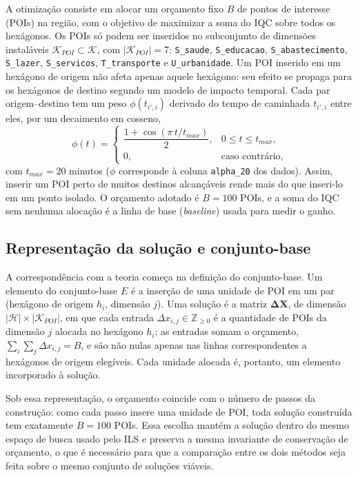 \documentclass[11pt,a4paper]{article}
\newcommand{\code}[1]{\texttt{#1}}
\begin{document}
A otimização consiste em alocar um orçamento fixo $B$ de pontos de interesse (POIs) na região, com o objetivo de maximizar a soma do IQC sobre todos os hexágonos. Os POIs só podem ser inseridos no subconjunto de dimensões instaláveis $\mathcal{K}_{POI} \subset \mathcal{K}$, com $|\mathcal{K}_{POI}| = 7$: \code{S\_saude}, \code{S\_educacao}, \code{S\_abastecimento}, \code{S\_lazer}, \code{S\_servicos}, \code{T\_transporte} e \code{U\_urbanidade}. Um POI inserido em um hexágono de origem não afeta apenas aquele hexágono: seu efeito se propaga para os hexágonos de destino segundo um modelo de impacto temporal. Cada par origem--destino tem um peso $\phi(t_{i',i})$ derivado do tempo de caminhada $t_{i',i}$ entre eles, por um decaimento em cosseno,
\begin{equation}
\phi(t) =
\begin{cases}
\dfrac{1 + \cos\!\left(\pi\,t/t_{max}\right)}{2}, & 0 \le t \le t_{max},\\[2mm]
0, & \text{caso contrário},
\end{cases}
\label{eq:alpha20}
\end{equation}
com $t_{max} = 20$ minutos ($\phi$ corresponde à coluna \code{alpha\_20} dos dados). Assim, inserir um POI perto de muitos destinos alcançáveis rende mais do que inseri-lo em um ponto isolado. O orçamento adotado é $B = 100$ POIs, e a soma do IQC sem nenhuma alocação é a linha de base (\emph{baseline}) usada para medir o ganho.

\subsection{Representação da solução e conjunto-base}

A correspondência com a teoria começa na definição do conjunto-base. Um elemento do conjunto-base $E$ é a inserção de uma unidade de POI em um par (hexágono de origem $h_i$, dimensão $j$). Uma solução é a matriz $\mathbf{\Delta X}$, de dimensão $|\mathcal{H}| \times |\mathcal{K}_{POI}|$, em que cada entrada $\Delta x_{i,j} \in \mathbb{Z}_{\ge 0}$ é a quantidade de POIs da dimensão $j$ alocada no hexágono $h_i$; as entradas somam o orçamento, $\sum_{i}\sum_{j} \Delta x_{i,j} = B$, e são não nulas apenas nas linhas correspondentes a hexágonos de origem elegíveis. Cada unidade alocada é, portanto, um elemento incorporado à solução.

Sob essa representação, o orçamento coincide com o número de passos da construção: como cada passo insere uma unidade de POI, toda solução construída tem exatamente $B = 100$ POIs. Essa escolha mantém a solução dentro do mesmo espaço de busca usado pelo ILS e preserva a mesma invariante de conservação de orçamento, o que é necessário para que a comparação entre os dois métodos seja feita sobre o mesmo conjunto de soluções viáveis.
\end{document}
